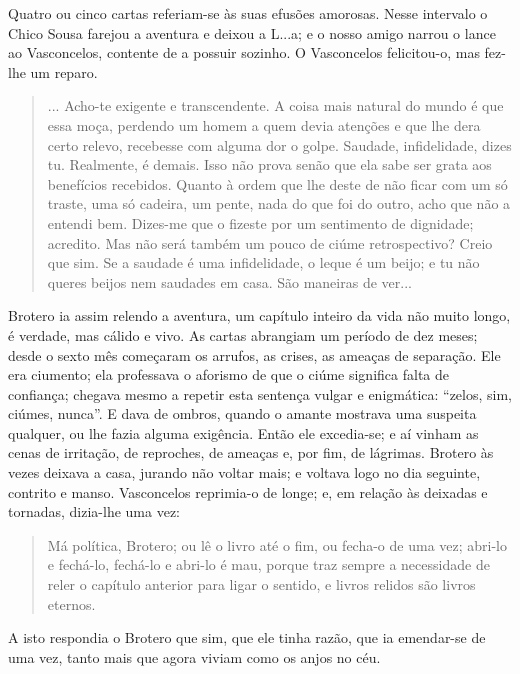 Quatro ou cinco cartas referiam-se às suas efusões amorosas. Nesse
intervalo o Chico Sousa farejou a aventura e deixou a L...a; e o nosso
amigo narrou o lance ao Vasconcelos, contente de a possuir sozinho. O
Vasconcelos felicitou-o, mas fez-lhe um reparo.

\begin{quote}
... Acho-te exigente e transcendente. A coisa mais natural do mundo é
que essa moça, perdendo um homem a quem devia atenções e que lhe dera
certo relevo, recebesse com alguma dor o golpe. Saudade, infidelidade,
dizes tu. Realmente, é demais. Isso não prova senão que ela sabe ser
grata aos benefícios recebidos. Quanto à ordem que lhe deste de não
ficar com um só traste, uma só cadeira, um pente, nada do que foi do
outro, acho que não a entendi bem. Dizes-me que o fizeste por um
sentimento de dignidade; acredito. Mas não será também um pouco de ciúme
retrospectivo? Creio que sim. Se a saudade é uma infidelidade, o leque é
um beijo; e tu não queres beijos nem saudades em casa. São maneiras de
ver...
\end{quote}

Brotero ia assim relendo a aventura, um capítulo inteiro da vida não
muito longo, é verdade, mas cálido e vivo. As cartas abrangiam um
período de dez meses; desde o sexto mês começaram os arrufos, as crises,
as ameaças de separação. Ele era ciumento; ela professava o aforismo de
que o ciúme significa falta de confiança; chegava mesmo a repetir esta
sentença vulgar e enigmática: ``zelos, sim, ciúmes, nunca''. E dava de
ombros, quando o amante mostrava uma suspeita qualquer, ou lhe fazia
alguma exigência. Então ele excedia-se; e aí vinham as cenas de
irritação, de reproches, de ameaças e, por fim, de lágrimas. Brotero às
vezes deixava a casa, jurando não voltar mais; e voltava logo no dia
seguinte, contrito e manso. Vasconcelos reprimia-o de longe; e, em
relação às deixadas e tornadas, dizia-lhe uma vez:

\begin{quote}
Má política, Brotero; ou lê o livro até o fim, ou fecha-o de uma vez;
abri-lo e fechá-lo, fechá-lo e abri-lo é mau, porque traz sempre a
necessidade de reler o capítulo anterior para ligar o sentido, e livros
relidos são livros eternos.
\end{quote}

A isto respondia o Brotero que sim, que ele tinha razão, que ia
emendar-se de uma vez, tanto mais que agora viviam como os anjos no céu.

